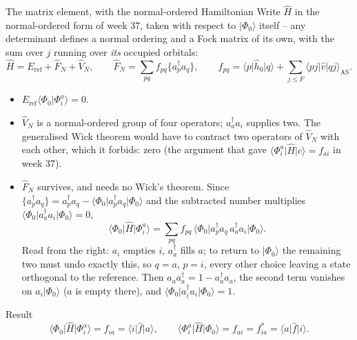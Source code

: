 \documentclass[aspectratio=169,10pt]{beamer}
\newcommand{\ket}[1]{\vert #1\rangle}
\newcommand{\braket}[2]{\langle #1\vert #2\rangle}
\newcommand{\element}[3]{\langle #1\vert #2\vert #3\rangle}
\newcommand{\nc}[1]{\bigl\{#1\bigr\}}
\begin{document}
\begin{frame}{The matrix element, with the normal-ordered Hamiltonian}
  \footnotesize
  Write $\hat{H}$ in the normal-ordered form of week 37, \alert{taken with respect to $\ket{\Phi_0}$ itself} -- any determinant defines a normal ordering and a Fock matrix of its own, with the sum over $j$ running over \emph{its} occupied orbitals:
  \[
    \hat{H}=E_{\mathrm{ref}}+\hat{F}_N+\hat{V}_N,\qquad
    \hat{F}_N=\sum_{pq}f_{pq}\nc{a_p^{\dagger}a_q},\qquad
    f_{pq}=\element{p}{\hat{h}_0}{q}+\sum_{j\le F}\element{pj}{\hat{v}}{qj}_{\mathrm{AS}} .
  \]
  \begin{itemize}\scriptsize
    \item $E_{\mathrm{ref}}\braket{\Phi_0}{\Phi_i^a}=0$.
    \item $\hat{V}_N$ is a normal-ordered group of four operators; $a_a^{\dagger}a_i$ supplies two. The generalised Wick theorem would have to contract two operators of $\hat{V}_N$ with each other, which it forbids: \alert{zero} (the argument that gave $\element{\Phi_i^a}{\hat{H}}{c}=f_{ai}$ in week 37).
    \item $\hat{F}_N$ survives, and needs no Wick's theorem. Since $\nc{a_p^{\dagger}a_q}=a_p^{\dagger}a_q-\element{\Phi_0}{a_p^{\dagger}a_q}{\Phi_0}$ and the subtracted number multiplies $\element{\Phi_0}{a_a^{\dagger}a_i}{\Phi_0}=0$,
    \[
      \element{\Phi_0}{\hat{H}}{\Phi_i^a}=\sum_{pq}f_{pq}\,\element{\Phi_0}{a_p^{\dagger}a_q\,a_a^{\dagger}a_i}{\Phi_0}.
    \]
    Read from the right: $a_i$ empties $i$, $a_a^{\dagger}$ fills $a$; to return to $\ket{\Phi_0}$ the remaining two must undo exactly this, so $q=a$, $p=i$, every other choice leaving a state orthogonal to the reference. Then $a_aa_a^{\dagger}=1-a_a^{\dagger}a_a$, the second term vanishes on $a_i\ket{\Phi_0}$ ($a$ is empty there), and $\element{\Phi_0}{a_i^{\dagger}a_i}{\Phi_0}=1$.
  \end{itemize}
  \begin{block}{Result}
    \[
      \element{\Phi_0}{\hat{H}}{\Phi_i^a}=f_{ia}=\element{i}{\hat{f}}{a},\qquad
      \element{\Phi_i^a}{\hat{H}}{\Phi_0}=f_{ai}=f_{ia}^{*}=\element{a}{\hat{f}}{i}.
    \]
  \end{block}
\end{frame}
\end{document}
